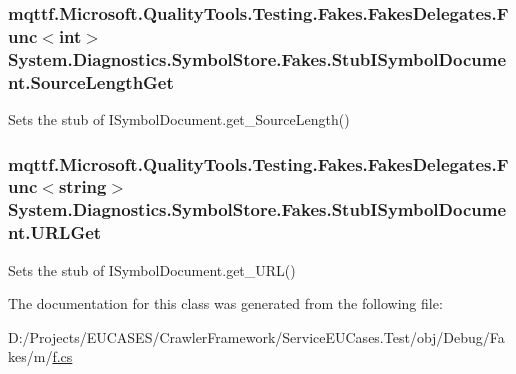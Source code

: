 \hypertarget{class_system_1_1_diagnostics_1_1_symbol_store_1_1_fakes_1_1_stub_i_symbol_document_ab6be3a2b772bc18a9fd8b5cef6f5f23e}{
\subsubsection[{Source\-Length\-Get}]{\setlength{\rightskip}{0pt plus 5cm}mqttf.\-Microsoft.\-Quality\-Tools.\-Testing.\-Fakes.\-Fakes\-Delegates.\-Func$<$int$>$ System.\-Diagnostics.\-Symbol\-Store.\-Fakes.\-Stub\-I\-Symbol\-Document.\-Source\-Length\-Get}}\label{class_system_1_1_diagnostics_1_1_symbol_store_1_1_fakes_1_1_stub_i_symbol_document_ab6be3a2b772bc18a9fd8b5cef6f5f23e}


Sets the stub of I\-Symbol\-Document.\-get\-\_\-\-Source\-Length()

\hypertarget{class_system_1_1_diagnostics_1_1_symbol_store_1_1_fakes_1_1_stub_i_symbol_document_a3b98a1cfef19903eba314896bab95281}{
\subsubsection[{U\-R\-L\-Get}]{\setlength{\rightskip}{0pt plus 5cm}mqttf.\-Microsoft.\-Quality\-Tools.\-Testing.\-Fakes.\-Fakes\-Delegates.\-Func$<$string$>$ System.\-Diagnostics.\-Symbol\-Store.\-Fakes.\-Stub\-I\-Symbol\-Document.\-U\-R\-L\-Get}}\label{class_system_1_1_diagnostics_1_1_symbol_store_1_1_fakes_1_1_stub_i_symbol_document_a3b98a1cfef19903eba314896bab95281}


Sets the stub of I\-Symbol\-Document.\-get\-\_\-\-U\-R\-L()



The documentation for this class was generated from the following file\-:\begin{DoxyCompactItemize}
\item 
D\-:/\-Projects/\-E\-U\-C\-A\-S\-E\-S/\-Crawler\-Framework/\-Service\-E\-U\-Cases.\-Test/obj/\-Debug/\-Fakes/m/\hyperlink{m_2f_8cs}{f.\-cs}\end{DoxyCompactItemize}
